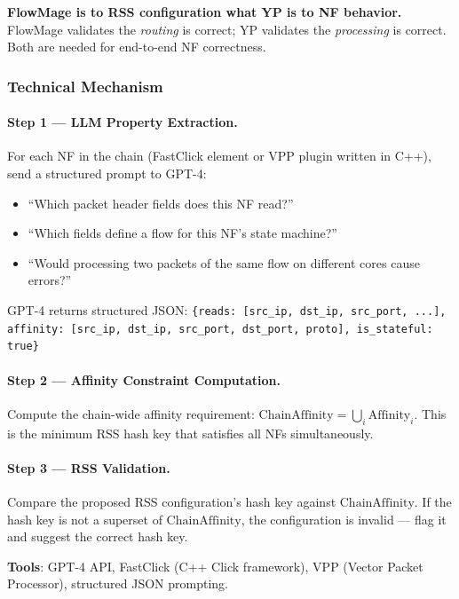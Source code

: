 \begin{insightbox}
\textbf{FlowMage is to RSS configuration what YP is to NF behavior.} FlowMage validates the \emph{routing} is correct; YP validates the \emph{processing} is correct. Both are needed for end-to-end NF correctness.
\end{insightbox}

\subsubsection{Technical Mechanism}

\paragraph{Step 1 --- LLM Property Extraction.}
For each NF in the chain (FastClick element or VPP plugin written in C++), send a structured prompt to GPT-4:
\begin{itemize}
  \item ``Which packet header fields does this NF read?''
  \item ``Which fields define a flow for this NF's state machine?''
  \item ``Would processing two packets of the same flow on different cores cause errors?''
\end{itemize}
GPT-4 returns structured JSON: \texttt{\{reads: [src\_ip, dst\_ip, src\_port, ...], affinity: [src\_ip, dst\_ip, src\_port, dst\_port, proto], is\_stateful: true\}}

\paragraph{Step 2 --- Affinity Constraint Computation.}
Compute the chain-wide affinity requirement: $\text{ChainAffinity} = \bigcup_{i} \text{Affinity}_i$. This is the minimum RSS hash key that satisfies all NFs simultaneously.

\paragraph{Step 3 --- RSS Validation.}
Compare the proposed RSS configuration's hash key against $\text{ChainAffinity}$. If the hash key is not a superset of $\text{ChainAffinity}$, the configuration is invalid --- flag it and suggest the correct hash key.

\textbf{Tools}: GPT-4 API, FastClick (C++ Click framework), VPP (Vector Packet Processor), structured JSON prompting.

